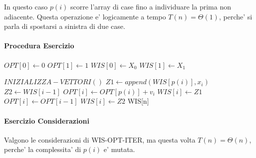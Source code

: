 In questo caso $p(i)$ scorre l'array di case fino a individuare la prima non adiacente.
Questa operazione e' logicamente a tempo $T(n) = \Theta(1)$, perche' si parla di spostarsi a sinistra di due case.

\pagebreak

\paragraph{Procedura Esercizio}

\begin{algorithm}
    \begin{algorithmic}
            \State $OPT[0] \gets 0$
            \State $OPT[1] \gets 1$
            \State $WIS[0] \gets X_0$
            \State $WIS[1] \gets X_1$
        \EndProcedure
    \end{algorithmic}
\end{algorithm}

\begin{algorithm}
    \begin{algorithmic}
            \State $INIZIALIZZA-VETTORI()$
                \State $Z1 \gets append(WIS[p(i)], x_i)$
                \State $Z2 \gets WIS[i-1]$
                    \State $OPT[i] \gets OPT[p(i)] + v_i$
                    \State $WIS[i] \gets Z1$
                \Else
                    \State $OPT[i] \gets OPT[i-1]$
                    \State $WIS[i] \gets Z2$
                \EndIf
            \EndFor
            \State \Return WIS[n]
        \EndProcedure
    \end{algorithmic}
\end{algorithm}

\pagebreak

\paragraph{Esercizio Considerazioni}

Valgono le considerazioni di WIS-OPT-ITER, ma questa volta $T(n) = \Theta(n)$, perche' la complessita' di $p(i)$ e' mutata.
